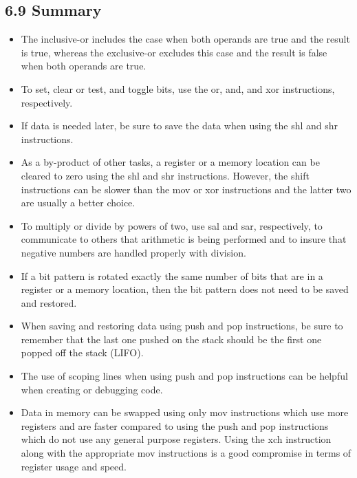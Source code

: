 \documentclass[10pt]{book}
\begin{document}
\begin{center}
\begin{center}
\subsection*{6.9 Summary}
\begin{itemize}
  \item The inclusive-or includes the case when both operands are true and the result is true, whereas the exclusive-or excludes this case and the result is false when both operands are true.
  \item To set, clear or test, and toggle bits, use the or, and, and xor instructions, respectively.
  \item If data is needed later, be sure to save the data when using the shl and shr instructions.
  \item As a by-product of other tasks, a register or a memory location can be cleared to zero using the shl and shr instructions. However, the shift instructions can be slower than the mov or xor instructions and the latter two are usually a better choice.
  \item To multiply or divide by powers of two, use sal and sar, respectively, to communicate to others that arithmetic is being performed and to insure that negative numbers are handled properly with division.
  \item If a bit pattern is rotated exactly the same number of bits that are in a register or a memory location, then the bit pattern does not need to be saved and restored.
  \item When saving and restoring data using push and pop instructions, be sure to remember that the last one pushed on the stack should be the first one popped off the stack (LIFO).
  \item The use of scoping lines when using push and pop instructions can be helpful when creating or debugging code.
  \item Data in memory can be swapped using only mov instructions which use more registers and are faster compared to using the push and pop instructions which do not use any general purpose registers. Using the xch instruction along with the appropriate mov instructions is a good compromise in terms of register usage and speed.
\end{itemize}



\end{center}
\end{center}
\end{document}
